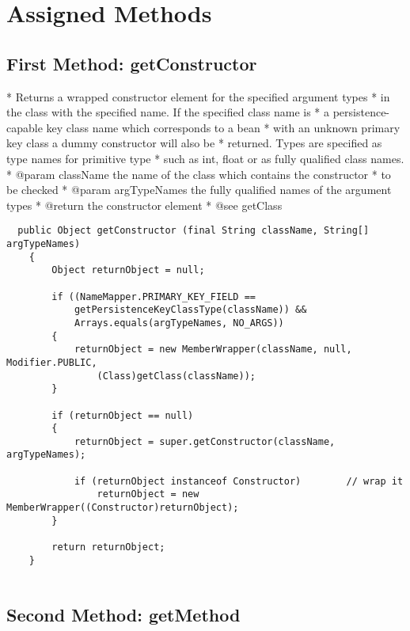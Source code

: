 \section{Assigned Methods}
\subsection{First Method: getConstructor} 
	 * Returns a wrapped constructor element for the specified argument types 
	 * in the class with the specified name.  If the specified class name is 
	 * a persistence-capable key class name which corresponds to a bean 
	 * with an unknown primary key class a dummy constructor will also be 
	 * returned.  Types are specified as type names for primitive type 
	 * such as int, float or as fully qualified class names.
	 * @param className the name of the class which contains the constructor 
	 * to be checked
	 * @param argTypeNames the fully qualified names of the argument types
	 * @return the constructor element
	 * @see getClass
	 
	 
\begin{lstlisting}	public Object getConstructor (final String className, String[] argTypeNames)
	{
		Object returnObject = null;

		if ((NameMapper.PRIMARY_KEY_FIELD == 
			getPersistenceKeyClassType(className)) && 
			Arrays.equals(argTypeNames, NO_ARGS))
		{
			returnObject = new MemberWrapper(className, null, Modifier.PUBLIC, 
				(Class)getClass(className));
		}

		if (returnObject == null)
		{
			returnObject = super.getConstructor(className, argTypeNames);

			if (returnObject instanceof Constructor)		// wrap it
				returnObject = new MemberWrapper((Constructor)returnObject);
		}

		return returnObject;
	}
	
\end{lstlisting}
	
	
\newpage
\subsection{Second Method: getMethod} 


